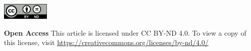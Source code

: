 \vspace{8mm}
\noindent
\includegraphics[height=8mm]{licenses/by-nd}

\begin{spacing}{.6}
\noindent
\textbf{Open Access} This article is licensed under CC BY-ND 4.0. To view a copy of this license, visit \url{https://creativecommons.org/licenses/by-nd/4.0/}
\end{spacing}